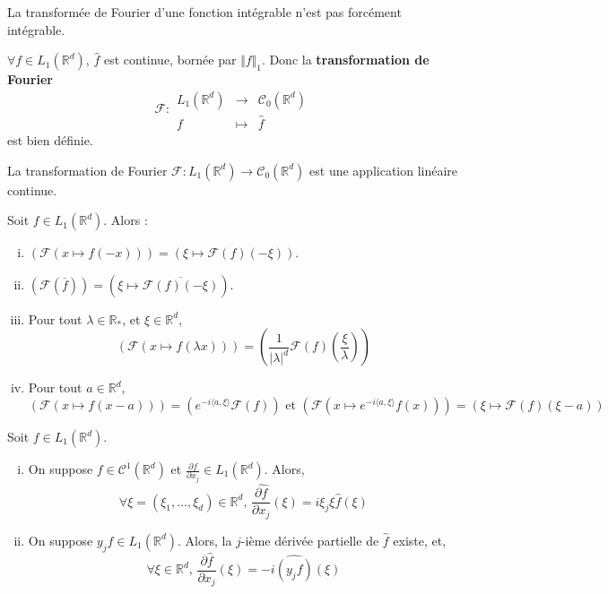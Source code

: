 	\begin{remark}
		La transformée de Fourier d'une fonction intégrable n'est pas forcément intégrable.
	\end{remark}
	
	\begin{theorem}
		$\forall f \in L_1(\mathbb{R}^d)$, $\widehat{f}$ est continue, bornée par $\Vert f \Vert_1$. Donc la \textbf{transformation de Fourier}
		\[
		\mathcal{F} :
		\begin{array}{ccc}
			L_1(\mathbb{R}^d) &\rightarrow& \mathcal{C}_0(\mathbb{R}^d) \\
			f &\mapsto& \widehat{f}
		\end{array}
		\]
		est bien définie.
	\end{theorem}
	
	\begin{corollary}
		La transformation de Fourier $\mathcal{F} : L_1(\mathbb{R}^d) \rightarrow \mathcal{C}_0(\mathbb{R}^d)$ est une application linéaire continue.
	\end{corollary}
	
	\begin{proposition}
		Soit $f \in L_1(\mathbb{R}^d)$. Alors :
		\begin{enumerate}[(i)]
			\item $(\mathcal{F}(x \mapsto f(-x))) = (\xi \mapsto \mathcal{F}(f)(-\xi))$.
			\item $(\mathcal{F}(\overline{f})) = (\xi \mapsto \overline{\mathcal{F}(f)(-\xi)})$.
			\item Pour tout $\lambda \in \mathbb{R}_*$, et $\xi \in \mathbb{R}^d$,
			\[ (\mathcal{F}(x \mapsto f(\lambda x))) = (\frac{1}{\vert \lambda \vert^d} \mathcal{F}(f) \left( \frac{\xi}{\lambda} \right)) \]
			\item Pour tout $a \in \mathbb{R}^d$,
			\[ (\mathcal{F}(x \mapsto f(x - a))) = (e^{-i \langle a, \xi \rangle} \mathcal{F}(f)) \text{ et } (\mathcal{F}(x \mapsto e^{-i \langle a, \xi \rangle} f(x))) = (\xi \mapsto \mathcal{F}(f)(\xi - a)) \]
		\end{enumerate}
	\end{proposition}
	
	
	\begin{proposition}
		Soit $f \in L_1(\mathbb{R}^d)$.
		\begin{enumerate}[(i)]
			\item On suppose $f \in \mathcal{C}^1(\mathbb{R}^d)$ et $\frac{\partial f}{\partial x_j} \in L_1(\mathbb{R}^d)$. Alors,
			\[ \forall \xi = (\xi_1, \dots, \xi_d) \in \mathbb{R}^d, \, \widehat{\frac{\partial f}{\partial x_j}}(\xi) = i \xi_j \xi \widehat{f}(\xi) \]
			\item On suppose $y_j f \in L_1(\mathbb{R}^d)$. Alors, la $j$-ième dérivée partielle de $\widehat{f}$ existe, et,
			\[ \forall \xi \in \mathbb{R}^d, \, \frac{\partial \widehat{f}}{\partial x_j}(\xi) = -i \widehat{(y_j f)}(\xi) \]
		\end{enumerate}
	\end{proposition}
	
